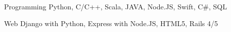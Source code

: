 


\begin{cvskills}


\cvskill
{Programming} %
{Python, C/C++, Scala, JAVA, Node.JS, Swift, C\#, SQL} %


\cvskill
{Web} %
{Django with Python, Express with Node.JS, HTML5, Rails 4/5} %



\end{cvskills}
